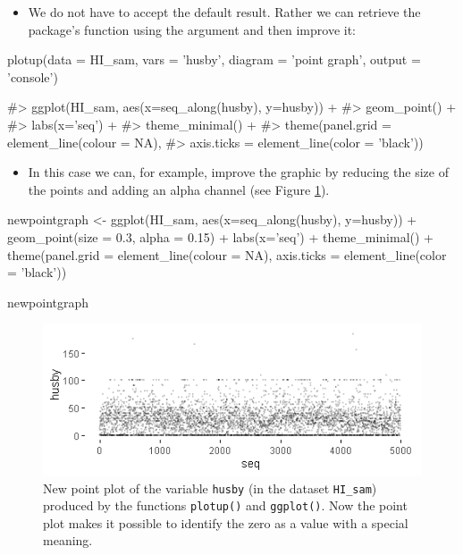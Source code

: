 \begin{itemize}
	\tightlist
	\item
	We do not have to accept the default result. Rather we can retrieve
	the package's  function using the argument
	 and then improve it:
\end{itemize}

\begin{example}
  plotup(data = HI_sam, vars = 'husby', diagram = 'point graph', 
  output = 'console')
\end{example}

\begin{Schunk}
	\begin{Soutput}
#> ggplot(HI_sam, aes(x=seq_along(husby), y=husby)) +
#>   geom_point() +
#>   labs(x='seq') +
#>   theme_minimal() +
#>   theme(panel.grid = element_line(colour = NA),
#>     axis.ticks = element_line(color = 'black'))
	\end{Soutput}
\end{Schunk}

\begin{itemize}
	\tightlist
	\item
	In this case we can, for example, improve the graphic by reducing the
	size of the points and adding an alpha channel (see Figure
	\ref{fig:HI_4}).
\end{itemize}

\begin{example}
  newpointgraph <- ggplot(HI_sam, aes(x=seq_along(husby), y=husby)) +
  geom_point(size = 0.3, alpha = 0.15) + 
  labs(x='seq') +
  theme_minimal() +
  theme(panel.grid = element_line(colour = NA), 
  axis.ticks = element_line(color = 'black'))

  newpointgraph
\end{example}

\begin{Schunk}
	\begin{figure}[H]
\includegraphics[width=0.6\linewidth]{figures/HI_4-1} \caption[Improved output]{New point plot of the variable \texttt{husby} (in the dataset \texttt{HI\_sam}) produced by the functions \texttt{plotup()} and \texttt{ggplot()}. Now the point plot makes it possible to identify the zero as a value with a special meaning.}\label{fig:HI_4}
	\end{figure}
\end{Schunk}

